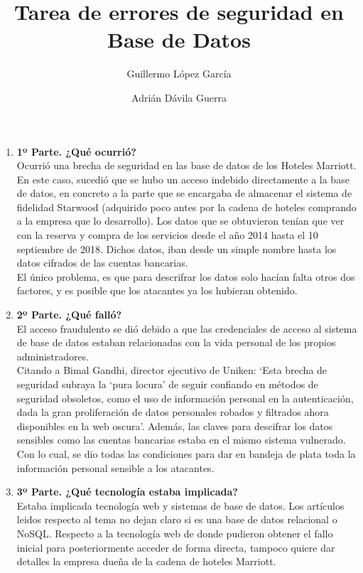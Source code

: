 \documentclass{article}
\title{Tarea de errores de seguridad en Base de Datos}
\author{
Guillermo López García
\and
Adrián Dávila Guerra
}
\begin{document}
\maketitle

\begin{enumerate}[label=\alph*]
    \item \textbf{1º Parte. ¿Qué ocurrió?}\\
        Ocurrió una brecha de seguridad en las base de datos de los Hoteles Marriott.
    En este caso, sucedió que se hubo un acceso indebido directamente a la base
    de datos, en concreto a la parte que se encargaba de almacenar el
    sistema de fidelidad Starwood (adquirido poco antes por la cadena de hoteles
    comprando a la empresa que lo desarrollo). Los datos que se obtuvieron tenían
    que ver con la reserva y compra de los servicios desde el año 2014 hasta
    el 10 septiembre de 2018. Dichos datos, iban desde un simple nombre
    hasta los datos cifrados de las cuentas bancarias.\\
    El único problema, es que para descrifrar los datos solo hacían
    falta otros dos factores, y es posible que los atacantes ya los
    hubieran obtenido.
    
    \item \textbf{2º Parte. ¿Qué falló?}\\
        El acceso fraudulento se dió debido a que las credenciales de acceso
    al sistema de base de datos estaban relacionadas con la vida personal
    de los propios administradores.\\
    Citando a Bimal Gandhi, director ejecutivo de Uniken:
    `Esta brecha de seguridad subraya la `pura locura'
    de seguir confiando en métodos de seguridad obsoletos, como el uso de
    información personal en la autenticación, dada la gran proliferación
    de datos personales robados y filtrados ahora disponibles en la web
    oscura'. Además, las claves para descifrar los datos sensibles como
    las cuentas bancarias estaba en el mismo sistema vulnerado.\\
    Con lo cual, se dio todas las condiciones para dar en bandeja de plata
    toda la información personal sensible a los atacantes.
    
    \item \textbf{3º Parte. ¿Qué tecnología estaba implicada?}\\
        Estaba implicada tecnología web y sistemas de base de datos.
    Los artículos leidos respecto al tema no dejan claro si es
    una base de datos relacional o NoSQL\@. Respecto a la tecnología
    web de donde pudieron obtener el fallo inicial para posteriormente
    acceder de forma directa, tampoco quiere dar detalles la empresa
    dueña de la cadena de hoteles Marriott.
    

\end{enumerate}
\end{document}
